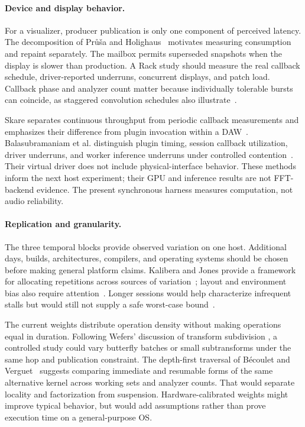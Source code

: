 \paragraph{Device and display behavior.}
For a visualizer, producer publication is only one component of perceived
latency. The decomposition of Pr\r{u}\v{s}a and Holighaus~\cite{prusa2016}
motivates measuring consumption and repaint separately. The mailbox permits
superseded snapshots when the display is slower than production. A Rack study
should measure the real callback schedule, driver-reported underruns,
concurrent displays, and patch load. Callback phase and analyzer count matter
because individually tolerable bursts can coincide, as staggered convolution
schedules also illustrate~\cite{borss2009}.

Skare separates continuous throughput from periodic callback measurements and
emphasizes their difference from plugin invocation within a
DAW~\cite{skare2024}. Balasubramaniam et al. distinguish plugin timing, session
callback utilization, driver underruns, and worker inference underruns under
controlled contention~\cite{balasubramaniam2026}. Their virtual driver does
not include physical-interface behavior. These methods inform the next host
experiment; their GPU and inference results are not FFT-backend evidence.
The present synchronous harness measures computation, not audio reliability.

\paragraph{Replication and granularity.}
The three temporal blocks provide observed variation on one host. Additional
days, builds, architectures, compilers, and operating systems should be chosen
before making general platform claims. Kalibera and Jones provide a framework
for allocating repetitions across sources of variation~\cite{kalibera2013};
layout and environment bias also require attention~\cite{mytkowicz2009}.
Longer sessions would help characterize infrequent stalls but would still not
supply a safe worst-case bound~\cite{wilhelm2008}.

The current weights distribute operation density without making operations
equal in duration. Following Wefers' discussion of transform subdivision
\cite{wefers2015}, a controlled study could vary butterfly batches or small
subtransforms under the same hop and publication constraint. The depth-first
traversal of B\'ecoulet and Verguet~\cite{becoulet2021} suggests comparing
immediate and resumable forms of the same alternative kernel across working
sets and analyzer counts. That would separate locality and factorization from
suspension. Hardware-calibrated weights might improve typical behavior, but
would add assumptions rather than prove execution time on a general-purpose OS.
